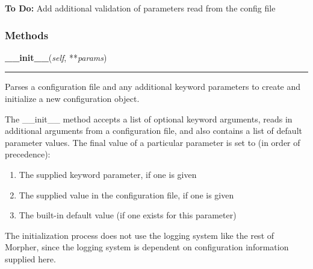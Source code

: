 \textbf{To Do:} Add additional validation of parameters read from the config file





  \subsubsection{Methods}

    \vspace{0.5ex}

\hspace{.8\funcindent}\begin{boxedminipage}{\funcwidth}

    \raggedright \textbf{\_\_init\_\_}(\textit{self}, **\textit{params})

    \vspace{-1.5ex}

    \rule{\textwidth}{0.5\fboxrule}
\setlength{\parskip}{2ex}
    Parses a configuration file and any additional keyword parameters to 
    create and initialize a new configuration object.

    The \_\_init\_\_ method accepts a list of optional keyword arguments, 
    reads in additional arguments from a configuration file, and also 
    contains a list of default parameter values. The final value of a 
    particular parameter is set to (in order of precedence):

    \begin{enumerate}

    \setlength{\parskip}{0.5ex}
      \item The supplied keyword parameter, if one is given

      \item The supplied value in the configuration file, if one is given

      \item The built-in default value (if one exists for this parameter)

    \end{enumerate}

    The initialization process does not use the logging system like the 
    rest of Morpher, since the logging system is dependent on configuration
    information supplied here.


\end{boxedminipage}

